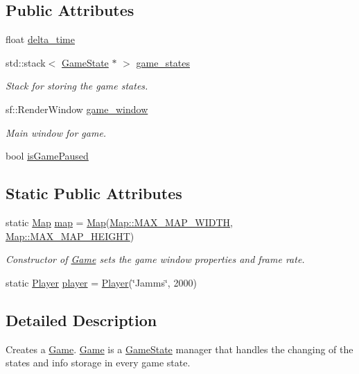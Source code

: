 \subsection*{Public Attributes}
\begin{DoxyCompactItemize}
\item 
float \hyperlink{class_game_ac66b5c6782d42e6c7344fad1cda50b67}{delta\+\_\+time}
\item 
std\+::stack$<$ \hyperlink{class_game_state}{Game\+State} $\ast$ $>$ \hyperlink{class_game_a5ed7be8060ef5d384b62f384fb8662ed}{game\+\_\+states}
\begin{DoxyCompactList}\small\item\em Stack for storing the game states. \end{DoxyCompactList}\item 
sf\+::\+Render\+Window \hyperlink{class_game_ae19475408ec62b8ed6d4109b56d28b1d}{game\+\_\+window}
\begin{DoxyCompactList}\small\item\em Main window for game. \end{DoxyCompactList}\item 
bool \hyperlink{class_game_aa897c46d369e8ab808ba5463691511da}{is\+Game\+Paused}
\end{DoxyCompactItemize}
\subsection*{Static Public Attributes}
\begin{DoxyCompactItemize}
\item 
static \hyperlink{class_map}{Map} \hyperlink{class_game_ab910de42d0cf4238d9d20815de472523}{map} = \hyperlink{class_map}{Map}(\hyperlink{class_map_ae9582bc1e99bdf1ecc5413f81cc95f69}{Map\+::\+M\+A\+X\+\_\+\+M\+A\+P\+\_\+\+W\+I\+D\+T\+H}, \hyperlink{class_map_aef313313ef5bbeafeae1f6b66073bace}{Map\+::\+M\+A\+X\+\_\+\+M\+A\+P\+\_\+\+H\+E\+I\+G\+H\+T})
\begin{DoxyCompactList}\small\item\em Constructor of \hyperlink{class_game}{Game} sets the game window properties and frame rate. \end{DoxyCompactList}\item 
static \hyperlink{class_player}{Player} \hyperlink{class_game_a6e48721b0532833b99fd5615a3628792}{player} = \hyperlink{class_player}{Player}(\char`\"{}Jamms\char`\"{}, 2000)
\end{DoxyCompactItemize}


\subsection{Detailed Description}
Creates a \hyperlink{class_game}{Game}. \hyperlink{class_game}{Game} is a \hyperlink{class_game_state}{Game\+State} manager that handles the changing of the states and info storage in every game state. 

